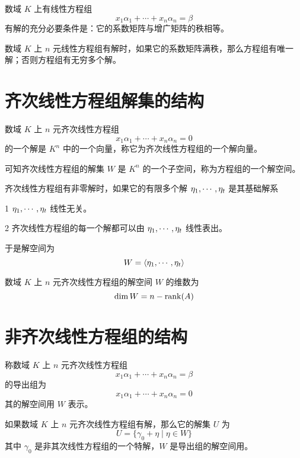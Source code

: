 \begin{theorem}
	数域 $K$ 上有线性方程组
	\[x_1\alpha_1 + \cdots + x_n\alpha_n = \beta\]
	有解的充分必要条件是：它的系数矩阵与增广矩阵的秩相等。
\end{theorem}

\begin{theorem}
	数域 $K$ 上 $n$ 元线性方程组有解时，如果它的系数矩阵满秩，那么方程组有唯一解；否则方程组有无穷多个解。
\end{theorem}

\section{齐次线性方程组解集的结构}

数域 $K$ 上 $n$ 元齐次线性方程组
\[x_1\alpha_1 + \cdots + x_n\alpha_n = 0\]
的一个解是 $K^n$ 中的一个向量，称它为齐次线性方程组的一个解向量。

可知齐次线性方程组的解集 $W$ 是 $K^n$ 的一个子空间，称为方程组的一个解空间。

\begin{definition}
	齐次线性方程组有非零解时，如果它的有限多个解 $\eta_1,\cdots,\eta_t$ 是其基础解系

	\num{1} $\eta_1,\cdots,\eta_t$ 线性无关。

	\num{2} 齐次线性方程组的每一个解都可以由 $\eta_1,\cdots,\eta_t$ 线性表出。
\end{definition}

于是解空间为
\[W = \langle \eta_1,\cdots,\eta_t \rangle\]

\begin{theorem}
	数域 $K$ 上 $n$ 元齐次线性方程组的解空间 $W$ 的维数为
	\[\dim W = n-\operatorname{rank}(A)\]
\end{theorem}

\section{非齐次线性方程组的结构}

称数域 $K$ 上 $n$ 元齐次线性方程组
\[x_1\alpha_1 + \cdots + x_n\alpha_n = \beta\]
的导出组为
\[x_1\alpha_1 + \cdots + x_n\alpha_n = 0\]
其的解空间用 $W$ 表示。

\begin{theorem}
	如果数域 $K$ 上 $n$ 元齐次线性方程组有解，那么它的解集 $U$ 为
	\[U = \{\gamma_0+\eta \mid \eta \in W\}\]
	其中 $\gamma_0$ 是非其次线性方程组的一个特解，$W$ 是导出组的解空间用。
\end{theorem}